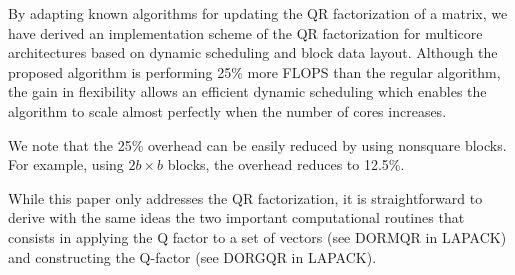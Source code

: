 \documentclass[runningheads]{llncs}
\begin{document}
By adapting known algorithms for updating the QR factorization of a
matrix, we have derived an implementation scheme of the QR
factorization for multicore architectures based on dynamic
scheduling and block data layout. Although the proposed algorithm is
performing 25\% more FLOPS than the regular algorithm, the gain in
flexibility allows an efficient dynamic scheduling which enables the
algorithm to scale almost perfectly when the number of cores
increases.

We note that the 25\% overhead can be easily reduced by using nonsquare blocks.
For example, using $2b\times b$ blocks, the overhead reduces to 12.5\%.

While this paper only addresses the QR factorization, it is straightforward to
derive with the same ideas the two important computational routines that consists
in applying the Q factor to a set of vectors (see DORMQR in LAPACK) and constructing
the Q-factor (see DORGQR in LAPACK).
\end{document}
